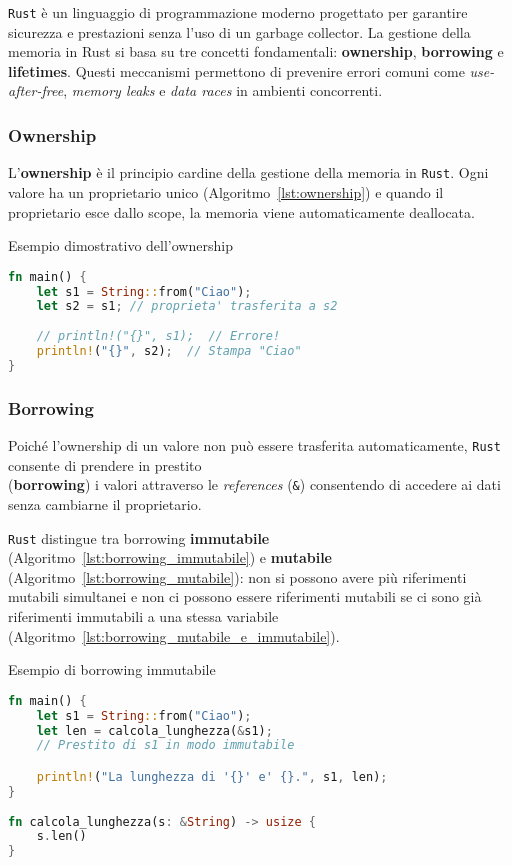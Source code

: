 \texttt{Rust} è un linguaggio di programmazione moderno progettato per garantire sicurezza e prestazioni senza l'uso di un garbage collector. La gestione della memoria in Rust si basa su tre concetti fondamentali: \textbf{ownership}, \textbf{borrowing} e \textbf{lifetimes}. Questi meccanismi permettono di prevenire errori comuni come \textit{use-after-free}, \textit{memory leaks} e \textit{data races} in ambienti concorrenti.

\subsubsection{Ownership}

L'\textbf{ownership} è il principio cardine della gestione della memoria in \texttt{Rust}. Ogni valore ha un proprietario unico (Algoritmo~\ref{lst:ownership}) e quando il proprietario esce dallo scope, la memoria viene automaticamente deallocata.

\begin{algorithm}[ht]
    \caption{Esempio dimostrativo dell'ownership}
    \label{lst:ownership}
    \begin{lstlisting}[language=Rust, style=colouredRust]
fn main() {
    let s1 = String::from("Ciao");
    let s2 = s1; // proprieta' trasferita a s2
   
    // println!("{}", s1);  // Errore!
    println!("{}", s2);  // Stampa "Ciao"
}
\end{lstlisting}
\end{algorithm}


\subsubsection{Borrowing}

Poiché l'ownership di un valore non può essere trasferita automaticamente, \texttt{Rust} consente di prendere in prestito \\(\textbf{borrowing}) i valori attraverso le \textit{references} (\texttt{\&}) consentendo di accedere ai dati senza cambiarne il proprietario.

\texttt{Rust} distingue tra borrowing \textbf{immutabile} (Algoritmo~\ref{lst:borrowing_immutabile}) e \textbf{mutabile} (Algoritmo~\ref{lst:borrowing_mutabile}): non si possono avere più riferimenti mutabili simultanei e non ci possono essere riferimenti mutabili se ci sono già riferimenti immutabili a una stessa variabile (Algoritmo~\ref{lst:borrowing_mutabile_e_immutabile}).

\begin{algorithm}[ht]
    \caption{Esempio di borrowing immutabile}
    \label{lst:borrowing_immutabile}
    \begin{lstlisting}[language=Rust, style=colouredRust]
fn main() {
    let s1 = String::from("Ciao");
    let len = calcola_lunghezza(&s1);
    // Prestito di s1 in modo immutabile

    println!("La lunghezza di '{}' e' {}.", s1, len);
}
        
fn calcola_lunghezza(s: &String) -> usize {
    s.len()
}
\end{lstlisting}
\end{algorithm}


